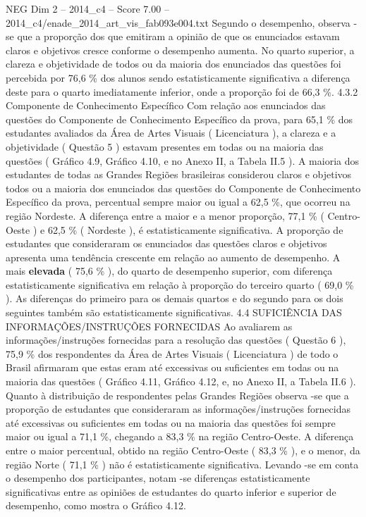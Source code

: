 \begin{textsample}{NEG Dim 2 – 2014\_c4 – Score 7.00 – 2014\_c4/enade\_2014\_art\_vis\_fab093e004.txt}
Segundo o desempenho, observa -se que a proporção dos que emitiram a opinião de que os enunciados estavam claros e objetivos cresce conforme o desempenho aumenta.
No quarto superior, a clareza e objetividade de todos ou da maioria dos enunciados das questões foi percebida por 76,6 \% dos alunos sendo estatisticamente significativa a diferença deste para o quarto imediatamente inferior, onde a proporção foi de 66,3 \%. 4.3.2 Componente de Conhecimento Específico Com relação aos enunciados das questões do Componente de Conhecimento Específico da prova, para 65,1 \% dos estudantes avaliados da Área de Artes Visuais ( Licenciatura ), a clareza e a objetividade ( Questão 5 ) estavam presentes em todas ou na maioria das questões ( Gráfico 4.9, Gráfico 4.10, e no Anexo II, a Tabela II.5 ).
A maioria dos estudantes de todas as Grandes Regiões brasileiras considerou claros e objetivos todos ou a maioria dos enunciados das questões do Componente de Conhecimento Específico da prova, percentual sempre maior ou igual a 62,5 \%, que ocorreu na região Nordeste.
A diferença entre a maior e a menor proporção, 77,1 \% ( Centro-Oeste ) e 62,5 \% ( Nordeste ), é estatisticamente significativa.
A proporção de estudantes que consideraram os enunciados das questões claros e objetivos apresenta uma tendência crescente em relação ao aumento de desempenho.
A mais \textbf{elevada} ( 75,6 \% ), do quarto de desempenho superior, com diferença estatisticamente significativa em relação à proporção do terceiro quarto ( 69,0 \% ).
As diferenças do primeiro para os demais quartos e do segundo para os dois seguintes também são estatisticamente significativas. 4.4 SUFICIÊNCIA DAS INFORMAÇÕES/INSTRUÇÕES FORNECIDAS Ao avaliarem as informações/instruções fornecidas para a resolução das questões ( Questão 6 ), 75,9 \% dos respondentes da Área de Artes Visuais ( Licenciatura ) de todo o Brasil afirmaram que estas eram até excessivas ou suficientes em todas ou na maioria das questões ( Gráfico 4.11, Gráfico 4.12, e, no Anexo II, a Tabela II.6 ).
Quanto à distribuição de respondentes pelas Grandes Regiões observa -se que a proporção de estudantes que consideraram as informações/instruções fornecidas até excessivas ou suficientes em todas ou na maioria das questões foi sempre maior ou igual a 71,1 \%, chegando a 83,3 \% na região Centro-Oeste.
A diferença entre o maior percentual, obtido na região Centro-Oeste ( 83,3 \% ), e o menor, da região Norte ( 71,1 \% ) não é estatisticamente significativa.
Levando -se em conta o desempenho dos participantes, notam -se diferenças estatisticamente significativas entre as opiniões de estudantes do quarto inferior e superior de desempenho, como mostra o Gráfico 4.12.

\end{textsample}

